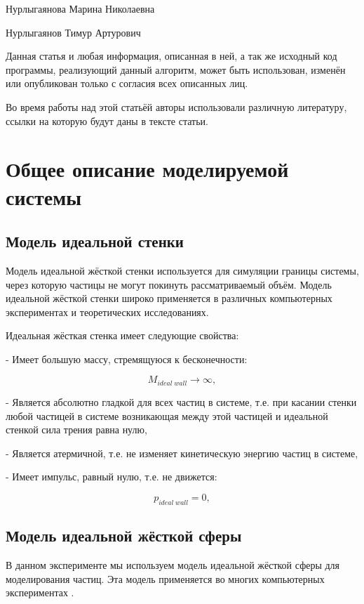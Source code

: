 \documentclass[a4paper]{article}
\begin{document}
Нурлыгаянова Марина Николаевна

Нурлыгаянов Тимур Артурович

Данная статья и любая информация, описанная в ней, а так же исходный код программы, реализующий данный алгоритм, может быть использован, изменён или опубликован только с согласия всех описанных лиц.

Во время работы над этой статьёй авторы использовали различную литературу, ссылки на которую будут даны в тексте статьи.

\newpage
\section{Общее описание моделируемой системы}

\subsection{Модель идеальной стенки}
Модель идеальной жёсткой стенки используется для симуляции границы системы, через которую частицы не могут покинуть рассматриваемый объём. Модель идеальной жёсткой стенки широко применяется в различных компьютерных экспериментах и теоретических исследованиях.

Идеальная жёсткая стенка имеет следующие свойства:

 - Имеет большую массу, стремящуюся к бесконечности:
 
\begin{equation}
        M_{ideal \; wall} \to \infty,
\end{equation}

 - Является абсолютно гладкой для всех частиц в системе, т.е. при касании стенки любой частицей в системе возникающая между этой частицей и идеальной стенкой сила трения равна нулю,
 
 - Является атермичной, т.е. не изменяет кинетическую энергию частиц в системе,
 
 - Имеет импульс, равный нулю, т.е. не движется:
 
\begin{equation}
        p_{ideal \; wall} = 0,
\end{equation}


\subsection{Модель идеальной жёсткой сферы}
В данном эксперименте мы используем модель идеальной жёсткой сферы для моделирования частиц. Эта модель применяется во многих компьютерных экспериментах \cite{Rosenbluth_Chem_Phys_22_881_1954} \cite{Wood_and_Jacobson_1957} \cite{Alder_and_Wainwright_Phase_Transition_for_a_Hard_Sphere_System}.
\end{document}
